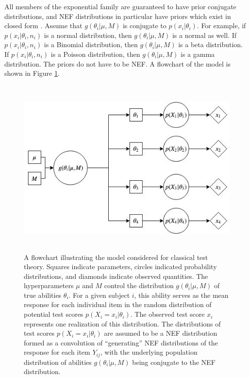 \documentclass[12pt,epsfig]{article}
\begin{document}
\noindent All members of the exponential family are guaranteed to have prior conjugate distributions, and NEF distributions in particular have priors which exist in closed form \citep{Morris1983}. Assume that $g(\theta_i | \mu, M)$ is conjugate to $p(x_i | \theta_i)$. For example, if $p(x_i | \theta_i, n_i)$ is a normal distribution, then $g(\theta_i | \mu, M)$ is a normal as well. If $p(x_i | \theta_i, n_i)$ is a Binomial distribution, then $g(\theta_i | \mu, M)$ is a beta distribution. If $p(x_i | \theta_i, n_i)$ is a Poisson distribution, then $g(\theta_i | \mu, M)$ is a gamma distribution. The priors do not have to be NEF. A flowchart of the model is shown in Figure \ref{Fig:Flowchart}.



\begin{figure}
    \centering
    \includegraphics[height=90mm]{CT.jpg}
    \caption{A flowchart illustrating the model considered for classical test theory. Squares indicate parameters, circles indicated probability distributions, and diamonds indicate observed quantities. The hyperparameters $\mu$ and $M$ control the distribution $g(\theta_i | \mu, M)$ of true abilities $\theta_i$. For a given subject $i$, this ability serves as the mean response for each individual item in the random distribution of potential test scores $p(X_i = x_i| \theta_i)$. The observed test score $x_i$ represents one realization of this distribution. The distributions of test scores $p(X_i = x_i| \theta_i)$ are assumed to be a NEF distribution formed as a convolution of ``generating'' NEF distributions of the response for each item $Y_{ij}$, with the underlying population distribution of abilities $g(\theta_i | \mu, M)$ being conjugate to the NEF distribution.}
    \label{Fig:Flowchart}
\end{figure}
\end{document}
